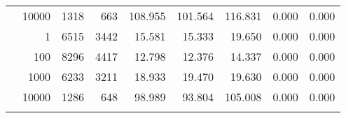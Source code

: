 \begin{table}
\begin{tabular}{rrrrrrrrr}
	            
					 &  
					 
					\multirow{ 1 }{*}{ 10000 } &
					
						
							    
							     1318  & 663  
	                           & 108.955 & 101.564 & 116.831
	                           & 0.000 & 0.000  \\
	                
	            
	        
				\noalign{\smallskip}\hline
				\multirow{ 4 }{*}{ 500000 } &
				
					
					 
					\multirow{ 1 }{*}{ 1 } &
					
						
							    
							     6515  & 3442  
	                           & 15.581 & 15.333 & 19.650
	                           & 0.000 & 0.000  \\
	                
	            
					 &  
					 
					\multirow{ 1 }{*}{ 100 } &
					
						
							    
							     8296  & 4417  
	                           & 12.798 & 12.376 & 14.337
	                           & 0.000 & 0.000  \\
	                
	            
					 &  
					 
					\multirow{ 1 }{*}{ 1000 } &
					
						
							    
							     6233  & 3211  
	                           & 18.933 & 19.470 & 19.630
	                           & 0.000 & 0.000  \\
	                
	            
					 &  
					 
					\multirow{ 1 }{*}{ 10000 } &
					
						
							    
							     1286  & 648  
	                           & 98.989 & 93.804 & 105.008
	                           & 0.000 & 0.000  \\
	                
	            
	        
				\noalign{\smallskip}\hline
				\multirow{ 4 }{*}{ 1000000 } &
				

\end{tabular}
\end{table}
